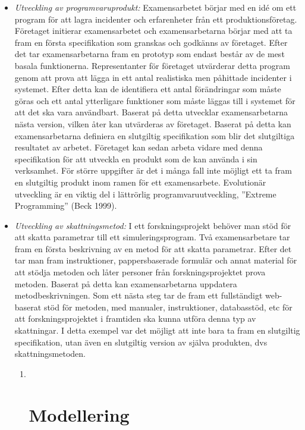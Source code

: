 \begin{itemize}
\item
  \emph{Utveckling av programvaruprodukt:} Examensarbetet börjar med en
  idé om ett program för att lagra incidenter och erfarenheter från ett
  produktionsföretag. Företaget initierar examensarbetet och
  examensarbetarna börjar med att ta fram en första specifikation som
  granskas och godkänns av företaget. Efter det tar examensarbetarna
  fram en prototyp som endast består av de mest basala funktionerna.
  Representanter för företaget utvärderar detta program genom att prova
  att lägga in ett antal realistiska men påhittade incidenter i
  systemet. Efter detta kan de identifiera ett antal förändringar som
  måste göras och ett antal ytterligare funktioner som måste läggas till
  i systemet för att det ska vara användbart. Baserat på detta utvecklar
  examensarbetarna nästa version, vilken åter kan utvärderas av
  företaget. Baserat på detta kan examensarbetarna definiera en
  slutgiltig specifikation som blir det slutgiltiga resultatet av
  arbetet. Företaget kan sedan arbeta vidare med denna specifikation för
  att utveckla en produkt som de kan använda i sin verksamhet. För
  större uppgifter är det i många fall inte möjligt ett ta fram en
  slutgiltig produkt inom ramen för ett examensarbete. Evolutionär
  utveckling är en viktig del i lättrörlig programvaruutveckling,
  ''Extreme Programming'' (Beck 1999).
\item
  \emph{Utveckling av skattningsmetod:} I ett forskningsprojekt behöver
  man stöd för att skatta parametrar till ett simuleringsprogram. Två
  examensarbetare tar fram en första beskrivning av en metod för att
  skatta parametrar. Efter det tar man fram instruktioner,
  pappersbaserade formulär och annat material för att stödja metoden och
  låter personer från forskningsprojektet prova metoden. Baserat på
  detta kan examensarbetarna uppdatera metodbeskrivningen. Som ett nästa
  steg tar de fram ett fullständigt web-baserat stöd för metoden, med
  manualer, instruktioner, databasstöd, etc för att forskningsprojektet
  i framtiden ska kunna utföra denna typ av skattningar. I detta exempel
  var det möjligt att inte bara ta fram en slutgiltig specifikation,
  utan även en slutgiltig version av själva produkten, dvs
  skattningsmetoden.

  \begin{enumerate}
  \def\labelenumi{\arabic{enumi}.}
  \item ~
    \section{Modellering}\label{modellering}
  \end{enumerate}
\end{itemize}

